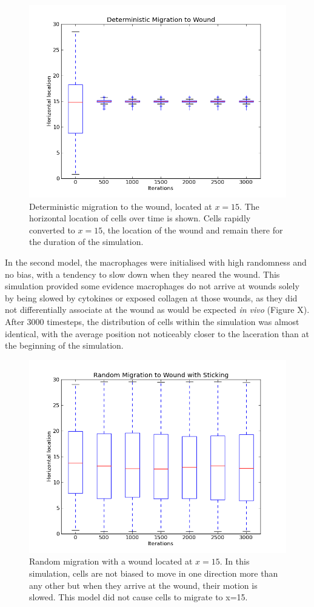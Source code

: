 \documentclass[12pt]{article}
\begin{document}
\begin{figure}[h]
\centering
\includegraphics[width=11.51cm]{media/DetMigrationtoWound.png}
\caption{Deterministic migration to the wound, located at \(x=15\). The horizontal location
  of cells over time is shown. Cells rapidly converted to \(x=15\), the 
location of the wound and remain there for the duration of the 
simulation.}
\end{figure}

In the second model, the macrophages were initialised with high 
randomness and no bias, with a tendency to slow down when they neared the 
wound. This simulation provided some evidence macrophages do not arrive 
at wounds solely by being slowed by cytokines or exposed collagen at 
those wounds, as they did not differentially associate at the wound as 
would be expected {\itshape in vivo} (Figure X). After 3000 timesteps, 
the distribution of cells within the simulation was almost identical, 
with the average position not noticeably closer to the laceration than 
at the beginning of the simulation.
\begin{figure}[H]
\centering
\includegraphics[width=11.51cm]{media/RandomMigrationtoWound.png}
\caption{Random migration with a wound located at \(x=15\). In this simulation, 
  cells are not biased
  to move in one direction more than any other but when they arrive at the wound,
  their motion is slowed. This model did not cause cells to migrate to x=15.
}
\end{figure}
\end{document}
